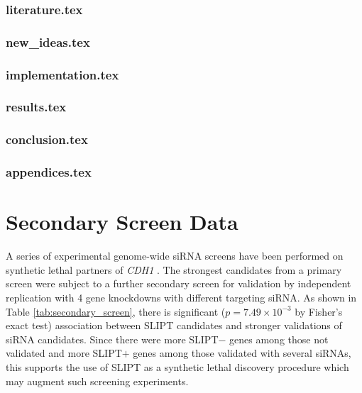 \subsection{literature.tex}

\subsection{new\_ideas.tex}

\subsection{implementation.tex}

\subsection{results.tex}

\subsection{conclusion.tex}

\subsection{appendices.tex}


\fi

\chapter{Secondary Screen Data}
\label{appendix:secondary_screen}

A series of experimental genome-wide siRNA screens have been performed on synthetic lethal partners of \textit{CDH1} \citep{Telford2015}. The strongest candidates from a primary screen were subject to a further secondary screen for validation by independent replication with 4 gene knockdowns with different targeting siRNA. As shown in Table \ref{tab:secondary_screen}, there is significant ($p=7.49 \times 10^{-3}$ by Fisher's exact test) %
association between SLIPT candidates and stronger validations of siRNA candidates. Since there were more SLIPT$-$ genes among those not validated and more SLIPT$+$ genes among those validated with several siRNAs, this supports the use of SLIPT as a synthetic lethal discovery procedure which may augment such screening experiments.

